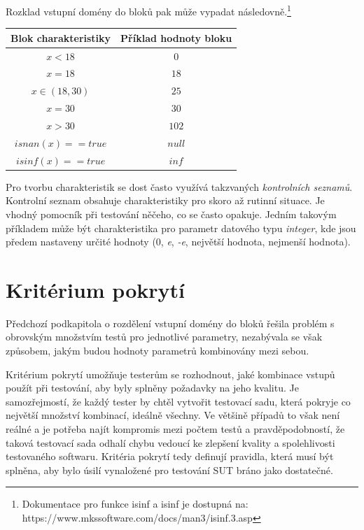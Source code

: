 Rozklad vstupní domény do bloků pak může vypadat následovně.\footnote{Dokumentace pro funkce isinf a isinf je dostupná na: https://www.mkssoftware.com/docs/man3/isinf.3.asp}

\begin{center}
\begin{tabular}{ |c|c| } 
 \hline
 Blok charakteristiky & Příklad hodnoty bloku \\ 
 \hline
 $x<18$ & $0$  \\ 
 $x=18$ & $18$  \\ 
 $x\in(18,30)$ & $25$  \\ 
 $x=30$ & $30$  \\ 
 $x>30$ & $102$  \\ 
 $isnan(x) == true$ & $null$  \\  
 $isinf(x) == true$ & $inf$  \\ 
 \hline
\end{tabular}
\end{center}


Pro tvorbu charakteristik se dost často využívá takzvaných \textit{kontrolních seznamů}. Kontrolní seznam obsahuje charakteristiky pro skoro až rutinní situace. Je vhodný pomocník při testování něčeho, co se často opakuje. Jedním takovým příkladem může být charakteristika pro parametr datového typu \textit{integer}, kde jsou předem nastaveny určité hodnoty (0, \textit{e}, \textit{-e}, největší hodnota, nejmenší hodnota). 




\section{Kritérium pokrytí}
\label{sec_KriteriumPokryti}
Předchozí podkapitola o rozdělení vstupní domény do bloků řešila problém s obrovským množstvím testů pro jednotlivé parametry, nezabývala se však způsobem, jakým budou hodnoty parametrů kombinovány mezi sebou.



Kritérium pokrytí umožňuje testerům se rozhodnout, jaké kombinace vstupů použít při testování, aby byly splněny požadavky na jeho kvalitu. Je samozřejmostí, že každý tester by chtěl vytvořit testovací sadu, která pokryje co největší množství kombinací, ideálně všechny. Ve většině případů to však není reálné a je potřeba najít kompromis mezi počtem testů a pravděpodobností, že taková testovací sada odhalí chybu vedoucí ke zlepšení kvality a spolehlivosti testovaného softwaru. Kritéria pokrytí tedy definují pravidla, která musí být splněna, aby bylo úsilí vynaložené pro testování SUT bráno jako dostatečné.  

